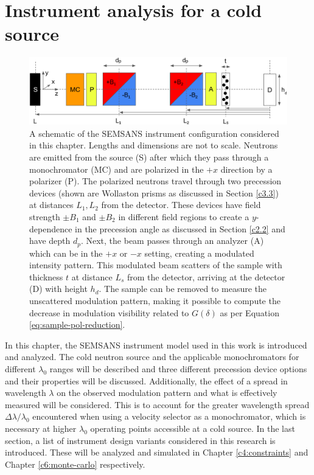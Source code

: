\chapter{Instrument analysis for a cold source}
\label{chapter:introduction}
\label{c3}
\begin{figure}[hbtp]
	\centering
	\includegraphics[width=\linewidth]{instrument-configuration}
	\caption{A schematic of the SEMSANS instrument configuration considered in this chapter. Lengths and dimensions are not to scale. Neutrons are emitted from the source (S) after which they pass through a monochromator (MC) and are polarized in the $+x$ direction by a polarizer (P). The polarized neutrons travel through two precession devices (shown are Wollaston prisms as discussed in Section \ref{c3.3}) at distances $L_1, L_2$ from the detector. These devices have field strength $\pm B_1$ and $\pm B_2$ in different field regions to create a $y$-dependence in the precession angle as discussed in Section \ref{c2.2} and have depth $d_p$. Next, the beam passes through an analyzer (A) which can be in the $+x$ or $-x$ setting, creating a modulated intensity pattern. This modulated beam scatters of the sample with thickness $t$ at distance $L_s$ from the detector, arriving at the detector (D) with height $h_d$. The sample can be removed to measure the unscattered modulation pattern, making it possible to compute the decrease in modulation visibility related to $G(\delta)$ as per Equation \eqref{eq:sample-pol-reduction}.}
	\label{fig:instrument-config}
\end{figure}

In this chapter, the SEMSANS instrument model used in this work is introduced and analyzed. The cold neutron source and the applicable monochromators for different $\lambda_0$ ranges will be described and three different precession device options and their properties will be discussed. Additionally, the effect of a spread in wavelength $\lambda$ on the observed modulation pattern and what is effectively measured will be considered. This is to account for the greater wavelength spread $\Delta\lambda/\lambda_0$ encountered when using a velocity selector as a monochromator, which is necessary at higher $\lambda_0$ operating points accessible at a cold source. In the last section, a list of instrument design variants considered in this research is introduced. These will be analyzed and simulated in Chapter \ref{c4:constraints} and Chapter \ref{c6:monte-carlo} respectively. 

